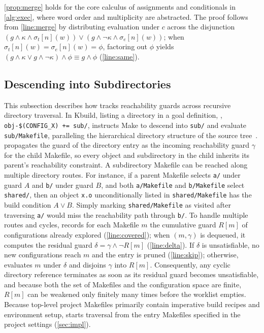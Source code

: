 \documentclass[acmsmall,screen,review,anonymous,nonacm]{acmart}
\begin{document}
  \noindent
  \autoref{prop:merge} holds for the core calculus of assignments and conditionals in \autoref{alg:exec}, where word order and multiplicity are abstracted.
  The proof follows from \autoref{line:merge} by distributing evaluation under $c$ across the disjunction $(g \land \kappa \land \sigma_t[n](w)) \lor (g \land \neg\kappa \land \sigma_e[n](w))$; when $\sigma_t[n](w) = \sigma_e[n](w) = \phi$, factoring out $\phi$ yields $(g \land \kappa \lor g \land \neg\kappa) \land \phi \equiv g \land \phi$ (\autoref{line:same}).

  \subsection{Descending into Subdirectories}\label{sec:approach:dirs}
  This subsection describes how \tool{} tracks reachability guards across recursive directory traversal.
  In Kbuild, listing a directory in a goal definition, \eg, \texttt{obj-\$(CONFIG\_X) += sub/}, instructs Make to descend into \texttt{sub/} and evaluate \texttt{sub/Makefile}, paralleling the hierarchical directory structure of the source tree~\cite{gazzillo2017kmax}.
  \tool{} propagates the guard of the directory entry as the incoming reachability guard $\gamma$ for the child Makefile, so every object and subdirectory in the child inherits its parent's reachability constraint.
  A subdirectory Makefile can be reached along multiple directory routes.
  For instance, if a parent Makefile selects \texttt{a/} under guard $A$ and \texttt{b/} under guard $B$, and both \texttt{a/Makefile} and \texttt{b/Makefile} select \texttt{shared/}, then an object \texttt{x.o} unconditionally listed in \texttt{shared/Makefile} has the build condition $A \lor B$.
  Simply marking \texttt{shared/Makefile} as visited after traversing \texttt{a/} would miss the reachability path through \texttt{b/}.
  To handle multiple routes and cycles, \tool{} records for each Makefile $m$ the cumulative guard $R[m]$ of configurations already explored (\autoref{line:covered}); when $(m, \gamma)$ is dequeued, it computes the residual guard $\delta = \gamma \land \neg R[m]$ (\autoref{line:delta}).
  If $\delta$ is unsatisfiable, no new configurations reach $m$ and the entry is pruned (\autoref{line:skip}); otherwise, \tool{} evaluates $m$ under $\delta$ and disjoins $\gamma$ into $R[m]$.
  Consequently, any cyclic directory reference terminates as soon as its residual guard becomes unsatisfiable, and because both the set of Makefiles and the configuration space are finite, $R[m]$ can be weakened only finitely many times before the worklist empties.
  Because top-level project Makefiles primarily contain imperative build recipes and environment setup, \tool{} starts traversal from the entry Makefiles specified in the project settings (\autoref{sec:impl}).
\end{document}
